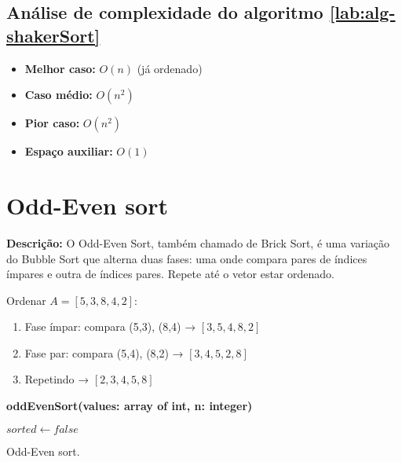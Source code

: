 \subsection{Análise de complexidade do algoritmo \ref{lab:alg-shakerSort}}
\begin{itemize}
    \item \textbf{Melhor caso:} $O(n)$ (já ordenado)
    \item \textbf{Caso médio:} $O(n^2)$
    \item \textbf{Pior caso:} $O(n^2)$
    \item \textbf{Espaço auxiliar:} $O(1)$
\end{itemize}


\section{Odd-Even sort}
\textbf{Descrição:} O Odd-Even Sort, também chamado de Brick Sort, é uma variação do Bubble Sort que alterna duas fases: uma onde compara pares de índices ímpares e outra de índices pares. Repete até o vetor estar ordenado.

\begin{exmp}
Ordenar $A = [5, 3, 8, 4, 2]$:

\begin{enumerate}
    \item Fase ímpar: compara (5,3), (8,4) → $[3, 5, 4, 8, 2]$
    \item Fase par: compara (5,4), (8,2) → $[3, 4, 5, 2, 8]$
    \item Repetindo → $[2, 3, 4, 5, 8]$
\end{enumerate}
\end{exmp}

\begin{center}
\begin{minipage}{.9\linewidth}
\begin{algorithm}[H]
\DontPrintSemicolon
\textbf{oddEvenSort(values: array of int, n: integer)}

$sorted \gets false$\;
\caption{Odd-Even sort.}
\label{lab:alg-oddEvenSort}
\end{algorithm}
\end{minipage}
\end{center}

